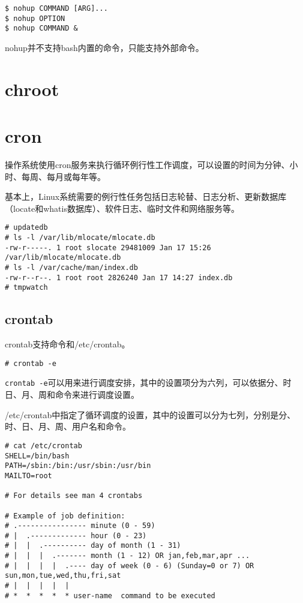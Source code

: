 \begin{verbatim}
$ nohup COMMAND [ARG]...
$ nohup OPTION
$ nohup COMMAND &
\end{verbatim}

nohup并不支持bash内置的命令，只能支持外部命令。


\section{chroot} 




\section{cron} 


操作系统使用cron服务来执行循环例行性工作调度，可以设置的时间为分钟、小时、每周、每月或每年等。

基本上，Linux系统需要的例行性任务包括日志轮替、日志分析、更新数据库（locate和whatis数据库）、软件日志、临时文件和网络服务等。

\begin{verbatim}
# updatedb
# ls -l /var/lib/mlocate/mlocate.db
-rw-r-----. 1 root slocate 29481009 Jan 17 15:26 /var/lib/mlocate/mlocate.db
# ls -l /var/cache/man/index.db
-rw-r--r--. 1 root root 2826240 Jan 17 14:27 index.db
# tmpwatch 
\end{verbatim}




\subsection{crontab}



crontab支持命令和/etc/crontab。

\begin{verbatim}
# crontab -e
\end{verbatim}

\texttt{crontab -e}可以用来进行调度安排，其中的设置项分为六列，可以依据分、时
日、月、周和命令来进行调度设置。




/etc/crontab中指定了循环调度的设置，其中的设置可以分为七列，分别是分、时、日、月、周、用户名和命令。

\begin{verbatim}
# cat /etc/crontab
SHELL=/bin/bash
PATH=/sbin:/bin:/usr/sbin:/usr/bin
MAILTO=root

# For details see man 4 crontabs

# Example of job definition:
# .---------------- minute (0 - 59)
# |  .------------- hour (0 - 23)
# |  |  .---------- day of month (1 - 31)
# |  |  |  .------- month (1 - 12) OR jan,feb,mar,apr ...
# |  |  |  |  .---- day of week (0 - 6) (Sunday=0 or 7) OR sun,mon,tue,wed,thu,fri,sat
# |  |  |  |  |
# *  *  *  *  * user-name  command to be executed
\end{verbatim}



